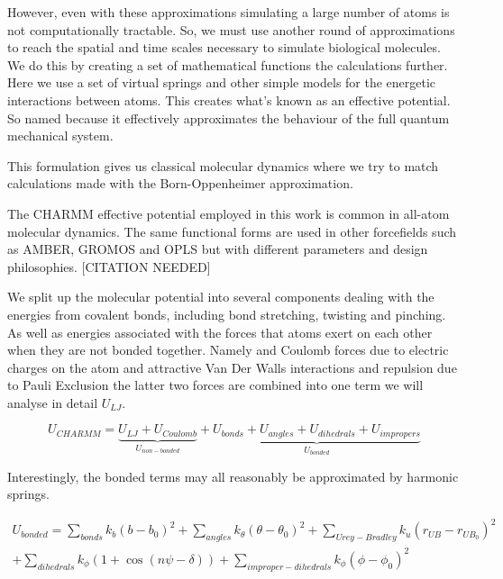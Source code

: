 However, even with these approximations simulating a large number of atoms is not computationally tractable. So, we must use another round of approximations to reach the spatial and time scales necessary to simulate biological molecules. We do this by creating a set of mathematical functions the calculations further. Here we use a set of virtual springs and other simple models for the energetic interactions between atoms. This creates what's known as an effective potential. So named because it effectively approximates the behaviour of the full quantum mechanical system.

This formulation gives us classical molecular dynamics where we try to match calculations made with the Born-Oppenheimer approximation. 

The CHARMM effective potential employed in this work is common in all-atom molecular dynamics. The same  functional forms are used in other forcefields such as AMBER, GROMOS and OPLS but with different parameters and design philosophies. [CITATION NEEDED]

We split up the molecular potential into several components dealing with the energies from covalent bonds, including bond stretching, twisting and pinching. As well as energies associated with the forces that atoms exert on each other when they are not bonded together. Namely and Coulomb forces due to electric charges on the atom and attractive Van Der Walls interactions and repulsion due to Pauli Exclusion the latter two forces are combined into one term we will analyse in detail $U_{LJ}$.

\begin{equation}
	U_{CHARMM} = \underbrace{U_{LJ} + U_{Coulomb}}_{U_{non-bonded}} + \underbrace{U_{bonds} + U_{angles} + U_{dihedrals} + U_{impropers}}_{U_{bonded} }
	\label{CHARMM}
\end{equation}

Interestingly, the bonded terms may all reasonably be approximated by harmonic springs. 

\begin{equation}\label{bonded_eqs}
	\begin{aligned}
	U_{bonded} = \sum_{bonds} k_{b} (b-b_0)^2 + \sum_{angles} k_\theta(\theta-\theta_0)^2+ \sum_{Urey-Bradley} k_u(r_{UB}-r_{UB_0})^2   \\ + \sum_{dihedrals} k_\phi (1+\cos(n \psi - \delta)) + \sum_{improper-dihedrals}  k_{\phi} (\phi - \phi_0)^2 
\end{aligned}
\end{equation}

